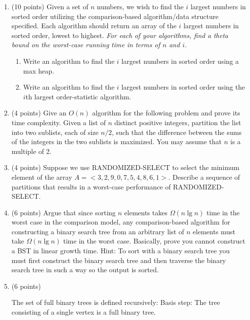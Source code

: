 \documentclass[12pt]{report}
\begin{document}
\maketitle

\begin{enumerate}[label=\arabic*.]
	\item (10 points) Given a set of $n$ numbers, we wish to find the $i$ largest numbers in sorted order utilizing the comparison-based algorithm/data structure specified. Each algorithm should return an array of the $i$ largest numbers in sorted order, lowest to highest. \emph{For each of your algorithms, find a theta bound on the worst-case running time in terms of $n$ and $i$.}
	\begin{enumerate}[label=\arabic{enumi}\alph*)]
	    \item Write an algorithm to find the $i$ largest numbers in sorted order using a max heap.
		\item Write an algorithm to find the $i$ largest numbers in sorted order using the $i$th largest order-statistic algorithm.
	\end{enumerate}
	\item (4 points) Give an $O(n)$ algorithm for the following problem and prove its time complexity. Given a list of $n$ distinct positive integers, partition the list into two sublists, each of size $n/2$, such that the difference between the sums of the integers in the two sublists is maximized. You may assume that $n$ is a multiple of 2.
	\item (4 points) Suppose we use RANDOMIZED-SELECT to select the minimum element of the array $A=<3,2,9,0,7,5,4,8,6,1>$. Describe a sequence of partitions that results in a worst-case performance of RANDOMIZED-SELECT.
	\item (6 points) Argue that since sorting $n$ elements takes $\Omega(n \lg n)$ time in the worst case in the comparison model, any comparison-based algorithm for constructing a binary search tree from an arbitrary list of $n$ elements must take $\Omega(n \lg n)$ time in the worst case. Basically, prove you cannot construct a BST in linear growth time. Hint: To sort with a binary search tree you must first construct the binary search tree and then traverse the binary search tree in such a way so the output is sorted.
	\item (6 points)\\
\begin{minipage}{0.6\textwidth}
The set of full binary trees is defined recursively: Basis step: The tree consisting of a single vertex is a full binary tree.\\


\end{minipage}
\end{enumerate}
\end{document}
